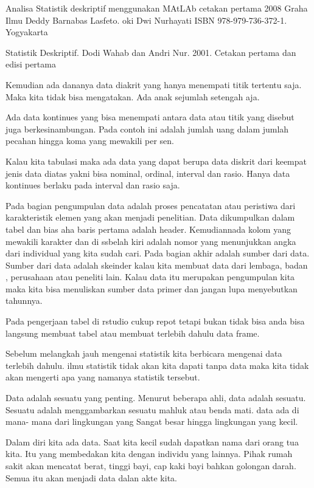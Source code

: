 \documentclass[
]{book}
\theoremstyle{definition}
\theoremstyle{definition}
\theoremstyle{definition}
\theoremstyle{definition}
\theoremstyle{remark}
\begin{document}
Analisa Statistik deskriptif menggunakan MAtLAb cetakan pertama 2008 Graha Ilmu Deddy Barnabas Lasfeto. oki Dwi Nurhayati ISBN 978-979-736-372-1. Yogyakarta

Statistik Deskriptif. Dodi Wahab dan Andri Nur. 2001. Cetakan pertama dan edisi pertama

Kemudian ada dananya data diakrit yang hanya menempati titik tertentu saja. Maka kita tidak bisa mengatakan. Ada anak sejumlah setengah aja.

Ada data kontinues yang bisa menempati antara data atau titik yang disebut juga berkesinambungan. Pada contoh ini adalah jumlah uang dalam jumlah pecahan hingga koma yang mewakili per sen.

Kalau kita tabulasi maka ada data yang dapat berupa data diskrit dari keempat jenis data diatas yakni bisa nominal, ordinal, interval dan rasio. Hanya data kontinues berlaku pada interval dan rasio saja.

Pada bagian pengumpulan data adalah proses pencatatan atau peristiwa dari karakteristik elemen yang akan menjadi penelitian. Data dikumpulkan dalam tabel dan bias aha baris pertama adalah header. Kemudiannada kolom yang mewakili karakter dan di ssbelah kiri adalah nomor yang menunjukkan angka dari individual yang kita sudah cari. Pada bagian akhir adalah sumber dari data. Sumber dari data adalah skeinder kalau kita membuat data dari lembaga, badan , perusahaan atau peneliti lain. Kalau data itu merupakan pengumpulan kita maka kita bisa menuliskan sumber data primer dan jangan lupa menyebutkan tahunnya.

Pada pengerjaan tabel di rstudio cukup repot tetapi bukan tidak bisa anda bisa langsung membuat tabel atau membuat terlebih dahulu data frame.

Sebelum melangkah jauh mengenai statistik kita berbicara mengenai data terlebih dahulu. ilmu statistik tidak akan kita dapati tanpa data maka kita tidak akan mengerti apa yang namanya statistik tersebut.

Data adalah sesuatu yang penting. Menurut beberapa ahli, data adalah sesuatu. Sesuatu adalah menggambarkan sesuatu mahluk atau benda mati. data ada di mana- mana dari lingkungan yang Sangat besar hingga lingkungan yang kecil.

Dalam diri kita ada data. Saat kita kecil sudah dapatkan nama dari orang tua kita. Itu yang membedakan kita dengan individu yang lainnya. Pihak rumah sakit akan mencatat berat, tinggi bayi, cap kaki bayi bahkan golongan darah. Semua itu akan menjadi data dalan akte kita.
\end{document}
